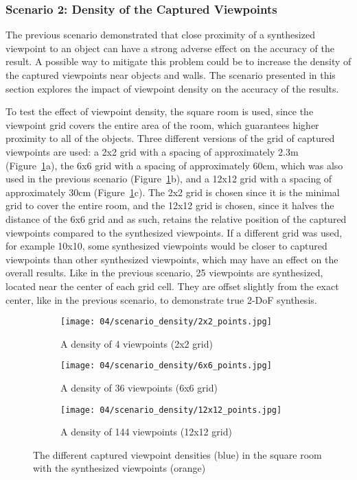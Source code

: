\subsubsection{Scenario 2: Density of the Captured Viewpoints}
The previous scenario demonstrated that close proximity of a synthesized viewpoint to an object can have a strong adverse effect on the accuracy of the result. A possible way to mitigate this problem could be to increase the density of the captured viewpoints near objects and walls. The scenario presented in this section explores the impact of viewpoint density on the accuracy of the results.

To test the effect of viewpoint density, the square room is used, since the viewpoint grid covers the entire area of the room, which guarantees higher proximity to all of the objects. Three different versions of the grid of captured viewpoints are used: a 2x2 grid with a spacing of approximately 2.3m (Figure~\ref{fig:density_setup}a), the 6x6 grid with a spacing of approximately 60cm, which was also used in the previous scenario (Figure~\ref{fig:density_setup}b), and a 12x12 grid with a spacing of approximately 30cm (Figure~\ref{fig:density_setup}c). The 2x2 grid is chosen since it is the minimal grid to cover the entire room, and the 12x12 grid is chosen, since it halves the distance of the 6x6 grid and as such, retains the relative position of the captured viewpoints compared to the synthesized viewpoints. If a different grid was used, for example 10x10, some synthesized viewpoints would be closer to captured viewpoints than other synthesized viewpoints, which may have an effect on the overall results.
Like in the previous scenario, 25 viewpoints are synthesized, located near the center of each grid cell. They are offset slightly from the exact center, like in the previous scenario, to demonstrate true 2-DoF synthesis.

\begin{figure}
\centering
    \hfill
    \begin{subfigure}[t]{0.3\textwidth}
            \centering
            \texttt{[image: 04/scenario\_density/2x2\_points.jpg]}
            \caption{A density of 4 viewpoints (2x2 grid)}
    \end{subfigure}
    \hfill
    \begin{subfigure}[t]{0.3\textwidth}
            \centering
            \texttt{[image: 04/scenario\_density/6x6\_points.jpg]}
            \caption{A density of 36 viewpoints (6x6 grid)}
    \end{subfigure}
    \hfill
    \begin{subfigure}[t]{0.3\textwidth}
            \centering
            \texttt{[image: 04/scenario\_density/12x12\_points.jpg]}
            \caption{A density of 144 viewpoints (12x12 grid)}
    \end{subfigure}
    \hfill
  \caption[The different captured viewpoint densities in the square room]{The different captured viewpoint densities (blue) in the square room with the synthesized viewpoints (orange)} \label{fig:density_setup}
\end{figure}

